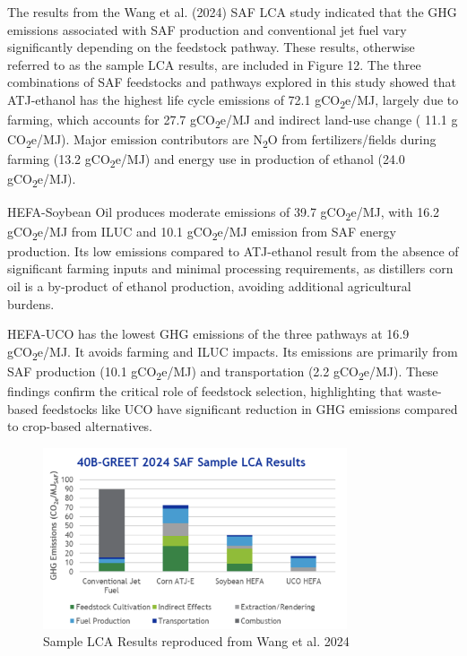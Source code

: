 \documentclass[12pt]{article}
\begin{document}
The results from the Wang et al. (2024) SAF LCA study indicated that the GHG emissions associated with SAF production and conventional jet fuel vary significantly depending on the feedstock pathway. These results, otherwise referred to as the sample LCA results, are included in Figure 12. The three combinations of SAF feedstocks and pathways explored in this study showed that ATJ-ethanol has the highest life cycle emissions of 72.1 gCO\textsubscript{2}e/MJ, largely due to farming, which accounts for 27.7 gCO\textsubscript{2}e/MJ and indirect land-use change ( 11.1 g CO\textsubscript{2}e/MJ). Major emission contributors are N\textsubscript{2}O from fertilizers/fields during farming (13.2 gCO\textsubscript{2}e/MJ) and energy use in production of ethanol (24.0 gCO\textsubscript{2}e/MJ).

HEFA-Soybean Oil produces moderate emissions of 39.7 gCO\textsubscript{2}e/MJ, with 16.2 gCO\textsubscript{2}e/MJ from ILUC and 10.1 gCO\textsubscript{2}e/MJ emission from SAF energy production. Its low emissions compared to ATJ-ethanol result from the absence of significant farming inputs and minimal processing requirements, as distillers corn oil is a by-product of ethanol production, avoiding additional agricultural burdens.

HEFA-UCO has the lowest GHG emissions of the three pathways at 16.9 gCO\textsubscript{2}e/MJ. It avoids farming and ILUC impacts. Its  emissions are primarily from SAF production (10.1 gCO\textsubscript{2}e/MJ) and transportation (2.2 gCO\textsubscript{2}e/MJ). These findings confirm the critical role of feedstock selection, highlighting that waste-based feedstocks like UCO have significant reduction in GHG emissions compared to crop-based alternatives.

\begin{figure}[H]
\centering
\includegraphics[width=0.8\textwidth]{Figures/samplelca.png} %
\caption{Sample LCA Results reproduced from Wang et al. 2024}
\label{fig:factors}
\end{figure}
\end{document}

